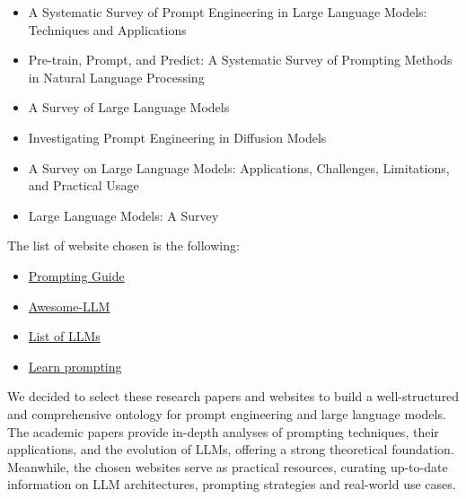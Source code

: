 \begin{itemize}
\item A Systematic Survey of Prompt Engineering in Large Language Models: Techniques and Applications \cite{sahoo2024systematic}

\item Pre-train, Prompt, and Predict: A Systematic Survey of Prompting Methods in Natural Language Processing \cite{liu2023pre}

\item A Survey of Large Language Models \cite{zhao2023survey}

\item Investigating Prompt Engineering in Diffusion
Models \cite{witteveen2022investigating}

\item A Survey on Large Language Models: Applications,
Challenges, Limitations, and Practical Usage \cite{hadi2023survey}

\item Large Language Models: A Survey \cite{minaee2024large}
\end{itemize}
The list of website chosen is the following:
\begin{itemize}
    \item \href{https://www.promptingguide.ai/}{Prompting Guide}
    
    \item \href{https://github.com/Hannibal046/Awesome-LLM}{Awesome-LLM}

    \item \href{https://llmmodels.org/}{List of LLMs}

    \item \href{https://learnprompting.org/}{Learn prompting}
\end{itemize}
We decided to select these research papers and websites to build a well-structured and comprehensive ontology for prompt engineering and large language models. The academic papers provide in-depth analyses of prompting techniques, their applications, and the evolution of LLMs, offering a strong theoretical foundation. Meanwhile, the chosen websites serve as practical resources, curating up-to-date information on LLM architectures, prompting strategies and real-world use cases. 


